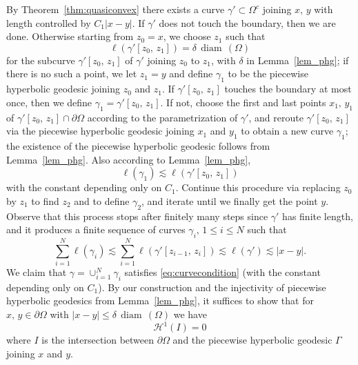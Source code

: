 \documentclass[reqno,11pt]{amsart}
\def\ch{{\mathcal H}}
\def\ls{\lesssim}
\def\diam{{\mathop\mathrm{\,diam\,}}}
\numberwithin{equation}{section}
\theoremstyle{remark}
\begin{document}
By Theorem~\ref{thm:quasiconvex} there exists a curve $\gamma'\subset \Omega^c$ joining $x,\,y$ with length controlled by $C_1|x-y|$. If $\gamma'$ does not touch the boundary, then we are done. 
Otherwise starting from $z_0=x$, we choose $z_1$ such that 
$$\ell(\gamma'[z_0,\,z_1])=\delta \diam(\Omega) $$
for the subcurve $\gamma'[z_0,\,z_1]$ of $\gamma'$ joining $z_0$ to $z_1$, with $\delta$ in Lemma~\ref{lem_phg}; if there is no such a point, we let $z_1=y$ and define $\gamma_1$ to be the piecewise hyperbolic geodesic joining $z_0$ and $z_1$. If $\gamma'[z_0,\,z_1]$ touches the boundary at most once, then we define $\gamma_1=\gamma'[z_0,\,z_1]$. If not, choose the first and last points $x_1,\,y_1$ of $\gamma'[z_0,\,z_1]\cap \partial \Omega$ according to the parametrization of $\gamma'$, and reroute $\gamma'[z_0,\,z_1]$ via the piecewise hyperbolic geodesic joining $x_1$ and $y_1$ to obtain a new curve $\gamma_1$; the existence of the piecewise hyperbolic geodesic follows from Lemma~\ref{lem_phg}. Also according to Lemma~\ref{lem_phg}, 
$$\ell(\gamma_1)\ls \ell(\gamma'[z_0,\,z_1])$$
with the constant depending only on $C_1$. 
Continue this procedure via replacing $z_0$ by $z_1$ to find $z_2$ and to define $\gamma_2$, and iterate until we finally get the point $y$. Observe that this process stops after finitely many steps since $\gamma'$ has finite length, and it produces a finite sequence of curves $\gamma_i,\,1\le i\le N$ such that
$$\sum_{i=1}^{N} \ell(\gamma_i)\ls \sum_{i=1}^{N} \ell(\gamma'[z_{i-1},\,z_i])\ls  \ell(\gamma')\ls |x-y|.$$
We claim that $\gamma=\cup_{i=1}^{N} \gamma_i$ satisfies \eqref{eq:curvecondition} (with the constant depending only on $C_1$). 
By our construction  and the injectivity of piecewise hyperbolic geodesics from Lemma~\ref{lem_phg}, it suffices to show that for $x,\,y\in \partial \Omega$ with $|x-y|\le \delta \diam(\Omega)$ we have 
$$\ch^1(I)=0$$
where $I$ is the intersection between $\partial \Omega$ and the piecewise hyperbolic geodesic $\Gamma$ joining $x$ and $y$.


\end{document}
